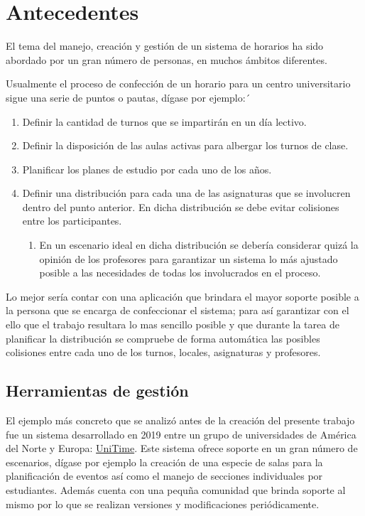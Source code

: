 \chapter{Antecedentes}\label{chapter:state_of_the_art} 

El tema del manejo, creación y gestión de un sistema de horarios ha sido abordado por un gran número de personas, en muchos ámbitos diferentes.

Usualmente el proceso de confección de un horario para un centro universitario sigue una serie de puntos o pautas, dígase por ejemplo:´
\begin{enumerate}
	\item Definir la cantidad de turnos que se impartirán en un día lectivo.
	\item Definir la disposición de las aulas activas para albergar los turnos de clase.
	\item Planificar los planes de estudio por cada uno de los años.
	\item Definir una distribución para cada una de las asignaturas que se involucren  dentro del punto anterior. En dicha distribución se debe evitar colisiones entre los participantes.
	\begin{enumerate}
		\item En un escenario ideal en dicha distribución se debería considerar quizá la opinión de los profesores para garantizar un sistema lo más ajustado posible a las necesidades de todas los involucrados en el proceso.
	\end{enumerate}
\end{enumerate}

Lo mejor sería contar con una aplicación que brindara el mayor soporte posible a la persona que se encarga de confeccionar el sistema; para así garantizar con el ello que el trabajo resultara lo mas sencillo posible y que durante la tarea de planificar la distribución se compruebe de forma automática las posibles colisiones entre cada uno de los turnos, locales, asignaturas y profesores.

\section{Herramientas de gestión}
El ejemplo más concreto que se analizó antes de la creación del presente trabajo fue un sistema desarrollado en 2019 entre un grupo de universidades de América del Norte y Europa: \href{https://www.unitime.org/}{UniTime}\cite{UniTime}. Este sistema ofrece soporte en un gran número de escenarios, dígase por ejemplo la creación de una especie de salas para la planificación de eventos así como el manejo de secciones individuales por estudiantes. Además cuenta con una pequña comunidad que brinda soporte al mismo por lo que se realizan versiones y modificaciones periódicamente.

